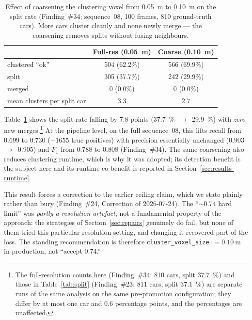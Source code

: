 \begin{table}[H]
  \centering
  \caption{Effect of coarsening the clustering voxel from \SI{0.05}{\metre} to
    \SI{0.10}{\metre} on the split rate (Finding~\#34; sequence~08, \num{100}
    frames, \num{810} ground-truth cars). More cars cluster cleanly and none newly
    merge --- the coarsening removes splits without fusing neighbours.}
  \label{tab:splitrate}
  \begin{tabular}{lcc}
    \toprule
    & Full-res (\SI{0.05}{\metre}) & Coarse (\SI{0.10}{\metre}) \\
    \midrule
    clustered ``ok''            & 504 (62.2\%) & 566 (69.9\%) \\
    split                        & 305 (37.7\%) & 242 (29.9\%) \\
    merged                       & 0 (0.0\%)    & 0 (0.0\%) \\
    mean clusters per split car  & 3.3          & 2.7 \\
    \bottomrule
  \end{tabular}
\end{table}

Table~\ref{tab:splitrate} shows the split rate falling by \num{7.8} points
(\SI{37.7}{\percent}~$\rightarrow$~\SI{29.9}{\percent}) with \emph{zero} new
merges.\footnote{The full-resolution counts here (Finding~\#34: \num{810} cars, split
\SI{37.7}{\percent}) and those in Table~\ref{tab:split} (Finding~\#23: \num{811}
cars, split \SI{37.1}{\percent}) are separate runs of the same analysis on the same
pre-promotion configuration; they differ by at most one car and \num{0.6} percentage
points, and the percentages are unaffected.}
At the pipeline level, on the full sequence~08, this lifts recall from \num{0.699} to
\num{0.730} ($+\num{1655}$ true positives) with precision essentially unchanged
(\num{0.903}~$\rightarrow$~\num{0.905}) and $F_1$ from \num{0.788} to \num{0.808}
(Finding~\#34). The same coarsening also reduces clustering runtime, which is why it
was adopted; its detection benefit is the subject here and its runtime co-benefit is
reported in Section~\ref{sec:results-runtime}.

This result forces a correction to the earlier ceiling claim, which we state plainly
rather than bury (Finding~\#24, Correction of 2026-07-24). The ``$\sim$\num{0.74}
hard limit'' was \emph{partly a resolution artefact}, not a fundamental property of
the approach: the strategies of Section~\ref{sec:repairs} genuinely do fail, but none
of them tried this particular resolution setting, and changing it recovered part of
the loss. The standing recommendation is therefore
\texttt{cluster\_voxel\_size}~$=\SI{0.10}{\metre}$ in production, not ``accept
\num{0.74}.''

